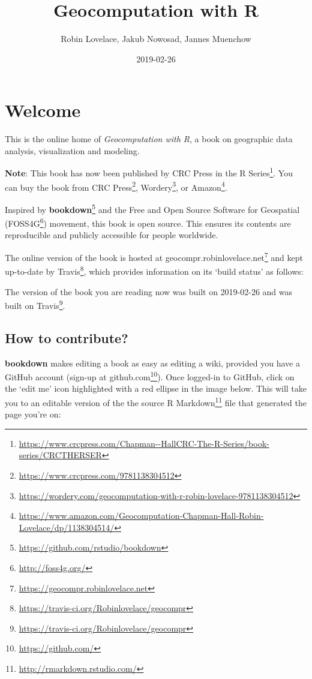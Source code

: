 \documentclass[]{krantz}
\title{Geocomputation with R}
\author{Robin Lovelace, Jakub Nowosad, Jannes Muenchow}
\date{2019-02-26}
\let\rmarkdownfootnote\footnote%
\def\footnote{\protect\rmarkdownfootnote}
\renewcommand{\href}[2]{#2\footnote{\url{#1}}}
\begin{document}
\maketitle

{
\setcounter{tocdepth}{2}
\tableofcontents
}
\listoftables
\listoffigures
\hypertarget{welcome}{%
\section*{Welcome}\label{welcome}}

This is the online home of \emph{Geocomputation with R}, a book on geographic data analysis, visualization and modeling.

\textbf{Note}: This book has now been published by CRC Press in the \href{https://www.crcpress.com/Chapman--HallCRC-The-R-Series/book-series/CRCTHERSER}{R Series}.
You can buy the book from \href{https://www.crcpress.com/9781138304512}{CRC Press}, \href{https://wordery.com/geocomputation-with-r-robin-lovelace-9781138304512}{Wordery}, or \href{https://www.amazon.com/Geocomputation-Chapman-Hall-Robin-Lovelace/dp/1138304514/}{Amazon}.

Inspired by \href{https://github.com/rstudio/bookdown}{\textbf{bookdown}} and the Free and Open Source Software for Geospatial (\href{http://foss4g.org/}{FOSS4G}) movement, this book is open source.
This ensures its contents are reproducible and publicly accessible for people worldwide.

The online version of the book is hosted at \href{https://geocompr.robinlovelace.net}{geocompr.robinlovelace.net} and kept up-to-date by \href{https://travis-ci.org/Robinlovelace/geocompr}{Travis}, which provides information on its `build status' as follows:

The version of the book you are reading now was built on 2019-02-26 and was built on \href{https://travis-ci.org/Robinlovelace/geocompr}{Travis}.

\hypertarget{how-to-contribute}{%
\subsection*{How to contribute?}\label{how-to-contribute}}

\textbf{bookdown} makes editing a book as easy as editing a wiki, provided you have a GitHub account (\href{https://github.com/}{sign-up at github.com}).
Once logged-in to GitHub, click on the `edit me' icon highlighted with a red ellipse in the image below.
This will take you to an editable version of the the source \href{http://rmarkdown.rstudio.com/}{R Markdown} file that generated the page you're on:
\end{document}
